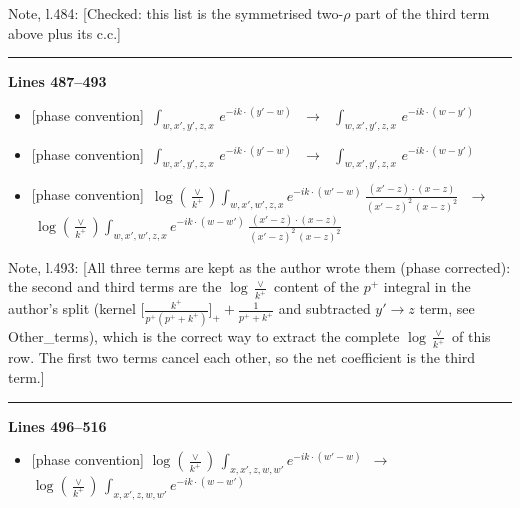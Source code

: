 \documentclass[10pt]{article}
\newenvironment{notebox}{\def\FrameCommand{{\color{notebar}\vrule width 1.5pt}\hspace{6pt}}\MakeFramed{\advance\hsize-\width\FrameRestore}\small}{\endMakeFramed}
\begin{document}
\begin{notebox}\textsf{\small Note, l.484:} [Checked: this list is the symmetrised two-$\rho$ part of the third term above plus its c.c.]\end{notebox}
\noindent\rule{\linewidth}{0.3pt}\par\noindent\textbf{Lines 487--493} \par
\begin{itemize}[leftmargin=2.2em,itemsep=1pt,topsep=2pt]
\item[\textbf{l.487}] \textsf{\small [phase convention]} $\displaystyle \,\int_{w,x',y',z,x}\, e^{-ik\cdot (y'-w)}\,$\ $\longrightarrow$\ $\displaystyle \,\int_{w,x',y',z,x}\, e^{-ik\cdot (w-y')}\,$
\item[\textbf{l.489}] \textsf{\small [phase convention]} $\displaystyle \,\int_{w,x',y',z,x}\, e^{-ik\cdot (y'-w)}\,$\ $\longrightarrow$\ $\displaystyle \,\int_{w,x',y',z,x}\, e^{-ik\cdot (w-y')}\,$
\item[\textbf{l.491}] \textsf{\small [phase convention]} $\displaystyle \,\log{(\frac{\vee}{k^{+}})}\int_{w,x',w',z,x} e^{-ik\cdot (w'-w)}\,\frac{(x'-z)\cdot (x-z)}{(x'-z)^{2}\,(x-z)^{2}}\,$\ $\longrightarrow$\ $\displaystyle \,\log{(\frac{\vee}{k^{+}})}\int_{w,x',w',z,x} e^{-ik\cdot (w-w')}\,\frac{(x'-z)\cdot (x-z)}{(x'-z)^{2}\,(x-z)^{2}}\,$
\end{itemize}
\begin{notebox}\textsf{\small Note, l.493:} [All three terms are kept as the author wrote them (phase corrected): the second and third terms are the $\log\frac{\vee}{k^{+}}$ content of the $p^{+}$ integral in the author's split (kernel $\big[\frac{k^{+}}{p^{+}(p^{+}+k^{+})}\big]_{+}+\frac{1}{p^{+}+k^{+}}$ and subtracted $y'\to z$ term, see Other\_terms), which is the correct way to extract the complete $\log\frac{\vee}{k^{+}}$ of this row. The first two terms cancel each other, so the net coefficient is the third term.]\end{notebox}
\noindent\rule{\linewidth}{0.3pt}\par\noindent\textbf{Lines 496--516} \par
\begin{itemize}[leftmargin=2.2em,itemsep=1pt,topsep=2pt]
\item[\textbf{l.496}] \textsf{\small [phase convention]} $\displaystyle \log{(\frac{\vee}{k^{+}})}\, \int_{x,x',z,w,w'}e^{-ik\cdot(w'-w)}$\ $\longrightarrow$\ $\displaystyle \log{(\frac{\vee}{k^{+}})}\, \int_{x,x',z,w,w'}e^{-ik\cdot(w-w')}$
\end{itemize}
\end{document}
